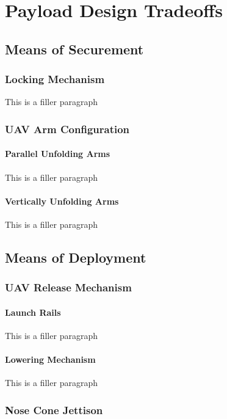 \chapter{Payload Design Tradeoffs}

\section{Means of Securement}\label{PL:Tradeoffs:Securement}
	\subsection{Locking Mechanism}
		This is a filler paragraph
		
	\subsection{UAV Arm Configuration}
		\subsubsection{Parallel Unfolding Arms}
			This is a filler paragraph

		\subsubsection{Vertically Unfolding Arms}
			This is a filler paragraph

\section{Means of Deployment}\label{PL:Tradeoffs:Deployment}
	\subsection{UAV Release Mechanism}
		\subsubsection{Launch Rails}
			This is a filler paragraph

		\subsubsection{Lowering Mechanism}
			This is a filler paragraph

	\subsection{Nose Cone Jettison}
